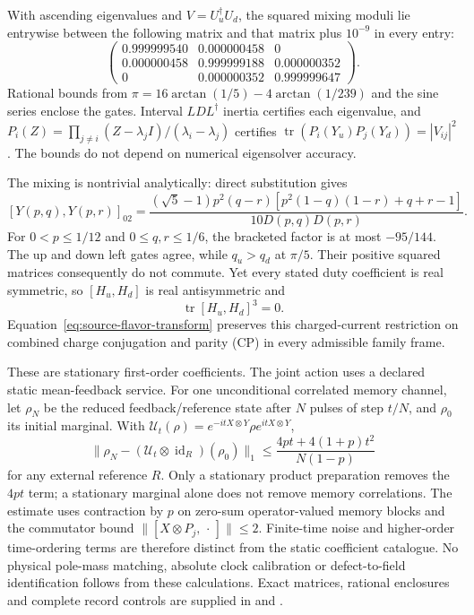 With ascending eigenvalues and \(V=U_u^\dagger U_d\), the squared mixing
moduli lie entrywise between the following matrix and that matrix plus
\(10^{-9}\) in every entry:
\begin{equation}
 \begin{pmatrix}
 0.999999540&0.000000458&0\\
 0.000000458&0.999999188&0.000000352\\
 0&0.000000352&0.999999647
 \end{pmatrix}.
 \label{eq:source-flavor-mixing-box}
\end{equation}
Rational bounds from \(\pi=16\arctan(1/5)-4\arctan(1/239)\) and the sine
series enclose the gates. Interval \(LDL^\dagger\) inertia certifies each
eigenvalue, and
\(P_i(Z)=\prod_{j\ne i}(Z-\lambda_jI)/(\lambda_i-\lambda_j)\)
certifies \(\operatorname{tr}(P_i(Y_u)P_j(Y_d))=|V_{ij}|^2\).
The bounds do not depend on numerical eigensolver accuracy.

The mixing is nontrivial analytically: direct substitution gives
\[
 [Y(p,q),Y(p,r)]_{02}=
 \frac{(\sqrt5-1)p^2(q-r)
 [p^2(1-q)(1-r)+q+r-1]}{10D(p,q)D(p,r)}.
\]
For \(0<p\le1/12\) and \(0\le q,r\le1/6\), the bracketed factor is at
most \(-95/144\). The up and down left gates agree, while
\(q_u>q_d\) at \(\pi/5\). Their positive squared matrices consequently
do not commute. Yet every stated duty coefficient is real symmetric, so
\([H_u,H_d]\) is real antisymmetric and
\begin{equation}
 \operatorname{tr}[H_u,H_d]^3=0.
 \label{eq:source-flavor-CP}
\end{equation}
Equation~\eqref{eq:source-flavor-transform} preserves this charged-current
restriction on combined charge conjugation and parity (CP) in every
admissible family frame.

These are stationary first-order coefficients. The joint action uses a
declared static mean-feedback service. For one unconditional correlated
memory channel, let \(\rho_N\) be the reduced feedback/reference state
after \(N\) pulses of step \(t/N\), and \(\rho_0\) its initial marginal.
With \(\mathcal U_t(\rho)=e^{-itX\otimes Y}\rho e^{itX\otimes Y}\),
\[
 \|\rho_N-(\mathcal U_t\otimes\operatorname{id}_R)(\rho_0)\|_1
 \le\frac{4pt+4(1+p)t^2}{N(1-p)}
\]
for any external reference \(R\). Only a stationary product preparation
removes the \(4pt\) term; a stationary marginal alone does not remove
memory correlations. The estimate uses contraction by \(p\) on zero-sum
operator-valued memory blocks and the commutator bound
\(\|[X\otimes P_j,\,\cdot\,]\|\le2\). Finite-time noise and higher-order time-ordering
terms are therefore distinct from the static coefficient catalogue.
No physical pole-mass matching, absolute clock calibration or defect-to-field
identification follows from these calculations. Exact matrices, rational
enclosures and complete record controls are supplied in
 and
.

